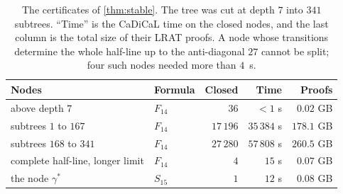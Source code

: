 \begin{table}[t]
\centering\small
\caption{The certificates of \cref{thm:stable}. The tree was cut at depth $7$
into $341$ subtrees. ``Time'' is the CaDiCaL time on the closed nodes, and the
last column is the total size of their LRAT proofs. A node whose transitions
determine the whole half-line up to the anti-diagonal $27$ cannot be split;
four such nodes needed more than $4$~s.}
\label{tab:stable}
\begin{tabular}{@{}llrrr@{}}
\toprule
Nodes & Formula & Closed & Time & Proofs\\
\midrule
above depth $7$ & $F_{14}$ & $36$ & $<1$ s & $0.02$ GB\\
subtrees $1$ to $167$ & $F_{14}$ & $17\,196$ & $35\,384$ s & $178.1$ GB\\
subtrees $168$ to $341$ & $F_{14}$ & $27\,280$ & $57\,808$ s & $260.5$ GB\\
complete half-line, longer limit & $F_{14}$ & $4$ & $15$ s & $0.07$ GB\\
the node $\gamma^\ast$ & $S_{15}$ & $1$ & $12$ s & $0.08$ GB\\
\bottomrule
\end{tabular}
\end{table}

